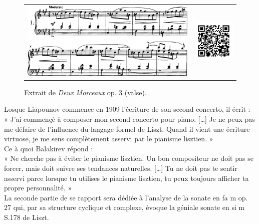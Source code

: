 \begin{figure}[!ht]
  \begin{bigcenter}
    \begin{tabular}{lr}
      \includegraphics[width=12.5cm, keepaspectratio]{liadov.png}
      &
      \includegraphics[width=3cm, keepaspectratio]{liadov-qr.png}
    \end{tabular}
  \end{bigcenter}
  \caption{\label{liadov}Extrait de \emph{Deux Morceaux} op. 3  (valse).}
\end{figure}

\indent Losque Liapounov commence en 1909 l'écriture de son second concerto, il écrit :\\
\indent« J'ai commençé à composer mon second concerto pour piano. [\dots] Je ne peux pas me défaire de l'influence du langage formel de Liszt. Quand il vient une écriture virtuose, je me sens complètement asservi par le pianisme lisztien. »\\

\indent Ce à quoi Balakirev répond :\\
\indent« Ne cherche pas à éviter le pianisme lisztien. Un bon compositeur ne doit pas se forcer, mais doit suivre ses tendances naturelles. [\dots] Tu ne doit pas te sentir asservi parce lorsque tu utilises le pianisme lisztien, tu peux toujours afficher ta propre personnalité. »\\

La seconde partie de se rapport sera dédiée à l'analyse de la sonate en fa m op. 27 qui, par sa structure cyclique et complexe, évoque la géniale sonate en si m S.178 de Liszt.\\

